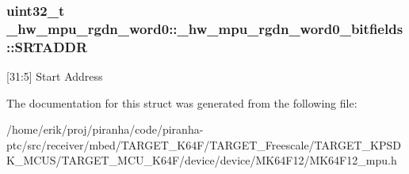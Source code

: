 \subsubsection[{\texorpdfstring{S\+R\+T\+A\+D\+DR}{SRTADDR}}]{\setlength{\rightskip}{0pt plus 5cm}uint32\+\_\+t \+\_\+hw\+\_\+mpu\+\_\+rgdn\+\_\+word0\+::\+\_\+hw\+\_\+mpu\+\_\+rgdn\+\_\+word0\+\_\+bitfields\+::\+S\+R\+T\+A\+D\+DR}\hypertarget{struct__hw__mpu__rgdn__word0_1_1__hw__mpu__rgdn__word0__bitfields_a5a92332780a22133ded37bd2d0a74e9a}{}\label{struct__hw__mpu__rgdn__word0_1_1__hw__mpu__rgdn__word0__bitfields_a5a92332780a22133ded37bd2d0a74e9a}
\mbox{[}31\+:5\mbox{]} Start Address 

The documentation for this struct was generated from the following file\+:\begin{DoxyCompactItemize}
\item 
/home/erik/proj/piranha/code/piranha-\/ptc/src/receiver/mbed/\+T\+A\+R\+G\+E\+T\+\_\+\+K64\+F/\+T\+A\+R\+G\+E\+T\+\_\+\+Freescale/\+T\+A\+R\+G\+E\+T\+\_\+\+K\+P\+S\+D\+K\+\_\+\+M\+C\+U\+S/\+T\+A\+R\+G\+E\+T\+\_\+\+M\+C\+U\+\_\+\+K64\+F/device/device/\+M\+K64\+F12/M\+K64\+F12\+\_\+mpu.\+h\end{DoxyCompactItemize}
